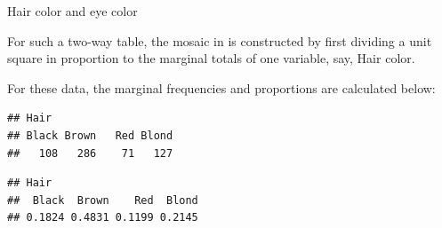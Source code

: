 \documentclass[11pt]{book}
\renewenvironment{knitrout}{\small\renewcommand{\baselinestretch}{.85}}{} %
\begin{document}
\begin{Example}[haireye2a]{Hair color and eye color}
\begin{knitrout}
\end{knitrout}

\begin{knitrout}
\color{fgcolor}\begin{kframe}
\begin{alltt}
 \hlstd{=}\hlstd{)}
 \hlkwb{<-}  \hlopt{:}\hlstd{)}
\end{alltt}
\end{kframe}
\end{knitrout}

For such a two-way table, the mosaic in  is constructed
by first dividing a unit square in proportion to the marginal
totals of one variable, say, Hair color.

For these data, the marginal frequencies and proportions are calculated below:
\begin{knitrout}
\color{fgcolor}\begin{kframe}
\begin{alltt}
 \hlkwb{<-} \hlstd{))}
\end{alltt}
\begin{verbatim}
## Hair
## Black Brown   Red Blond 
##   108   286    71   127
\end{verbatim}
\begin{alltt}
\end{alltt}
\begin{verbatim}
## Hair
##  Black  Brown    Red  Blond 
## 0.1824 0.4831 0.1199 0.2145
\end{verbatim}
\end{kframe}
\end{knitrout}

\begin{knitrout}
\color{fgcolor}\begin{figure}[!htbp]



\end{figure}
\end{knitrout}
\end{Example}
\end{document}
